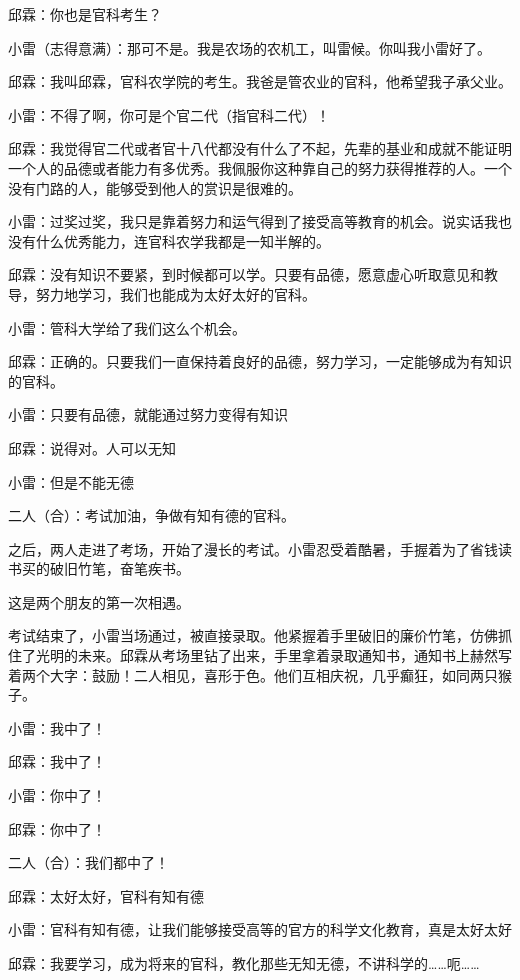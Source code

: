 \documentclass[UTF8,12pt,oneside]{ctexbook}
\begin{document}
    \songti
    邱霖：你也是官科考生？
    
    小雷（志得意满）：那可不是。我是农场的农机工，叫雷候。你叫我小雷好了。
    
    邱霖：我叫邱霖，官科农学院的考生。我爸是管农业的官科，他希望我子承父业。
    
    小雷：不得了啊，你可是个官二代（指官科二代）！
    
    邱霖：我觉得官二代或者官十八代都没有什么了不起，先辈的基业和成就不能证明一个人的品德或者能力有多优秀。我佩服你这种靠自己的努力获得推荐的人。一个没有门路的人，能够受到他人的赏识是很难的。
    
    小雷：过奖过奖，我只是靠着努力和运气得到了接受高等教育的机会。说实话我也没有什么优秀能力，连官科农学我都是一知半解的。
    
    邱霖：没有知识不要紧，到时候都可以学。只要有品德，愿意虚心听取意见和教导，努力地学习，我们也能成为太好太好的官科。
    
    小雷：管科大学给了我们这么个机会。
    
    邱霖：正确的。只要我们一直保持着良好的品德，努力学习，一定能够成为有知识的官科。
    
    小雷：只要有品德，就能通过努力变得有知识
    
    邱霖：说得对。人可以无知
    
    小雷：但是不能无德
    
    二人（合）：考试加油，争做有知有德的官科。
    
    \fangsong
    之后，两人走进了考场，开始了漫长的考试。小雷忍受着酷暑，手握着为了省钱读书买的破旧竹笔，奋笔疾书。
    
    这是两个朋友的第一次相遇。
    
    考试结束了，小雷当场通过，被直接录取。他紧握着手里破旧的廉价竹笔，仿佛抓住了光明的未来。邱霖从考场里钻了出来，手里拿着录取通知书，通知书上赫然写着两个大字：鼓励！二人相见，喜形于色。他们互相庆祝，几乎癫狂，如同两只猴子。
    
    \songti
    小雷：我中了！
    
    邱霖：我中了！
    
    小雷：你中了！
    
    邱霖：你中了！
    
    二人（合）：我们都中了！
    
    邱霖：太好太好，官科有知有德
    
    小雷：官科有知有德，让我们能够接受高等的官方的科学文化教育，真是太好太好
    
    邱霖：我要学习，成为将来的官科，教化那些无知无德，不讲科学的……呃……
    
\end{document}
